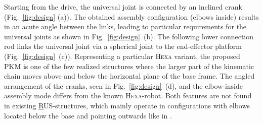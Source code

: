 \documentclass[runningheads,hidelinks]{llncs}
\begin{document}
Starting from the drive, the universal joint is connected by an inclined crank (Fig.~\ref{fig:design} (a)). 
The obtained assembly configuration (elbows inside) results in an acute angle between the links, leading 
to particular requirements for the universal joints as shown in Fig.~\ref{fig:design}~(b).
The following lower connection rod links the universal joint via a spherical joint to the end-effector platform (Fig.~\ref{fig:design}~(c)). 
Representing a particular \textsc{Hexa} variant, the proposed PKM is one of the few realized structures where the larger part of the kinematic chain moves above and below the horizontal plane of the base frame. 
The angled arrangement of the cranks, seen in Fig.~\ref{fig:design}~(d), and the elbow-inside assembly mode differs from the known \textsc{Hexa}-robot. 
Both features are not found in existing \underline{R}US-structures, which mainly operate in configurations with elbows located below the base and pointing outwards like in \cite{Frindt.2010}. 
\end{document}
